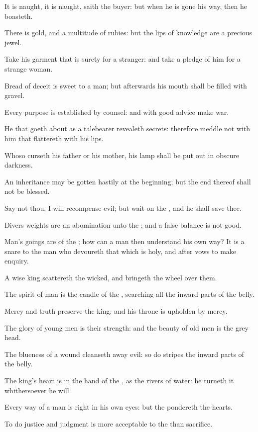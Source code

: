 \Verse It is naught, it is naught, saith the buyer: but when he is gone his way, then he boasteth.

\Verse There is gold, and a multitude of rubies: but the lips of knowledge are a precious jewel.

\Verse Take his garment that is surety for a stranger: and take a pledge of him for a strange woman.

\Verse Bread of deceit is sweet to a man; but afterwards his mouth shall be filled with gravel.

\Verse Every purpose is established by counsel: and with good advice make war.

\Verse He that goeth about as a talebearer revealeth secrets: therefore meddle not with him that flattereth with his lips.

\Verse Whoso curseth his father or his mother, his lamp shall be put out in obscure darkness.

\Verse An inheritance may be gotten hastily at the beginning; but the end thereof shall not be blessed.

\Verse Say not thou, I will recompense evil; but wait on the \LORD, and he shall save thee.

\Verse Divers weights are an abomination unto the \LORD; and a false balance is not good.

\Verse Man's goings are of the \LORD; how can a man then understand his own way?  \Verse It is a snare to the man who devoureth that which is holy, and after vows to make enquiry.

\Verse A wise king scattereth the wicked, and bringeth the wheel over them.

\Verse The spirit of man is the candle of the \LORD, searching all the inward parts of the belly.

\Verse Mercy and truth preserve the king: and his throne is upholden by mercy.

\Verse The glory of young men is their strength: and the beauty of old men is the grey head.

\Verse The blueness of a wound cleanseth away evil: so do stripes the inward parts of the belly.


\Chapter
\Verse The king's heart is in the hand of the \LORD, as the rivers of water: he turneth it whithersoever he will.

\Verse Every way of a man is right in his own eyes: but the \LORD pondereth the hearts.

\Verse To do justice and judgment is more acceptable to the \LORD than sacrifice.

